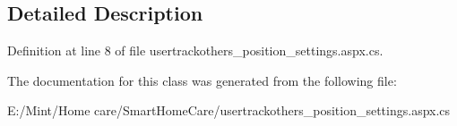 \subsection{Detailed Description}


Definition at line 8 of file usertrackothers\-\_\-position\-\_\-settings.\-aspx.\-cs.



The documentation for this class was generated from the following file\-:\begin{DoxyCompactItemize}
\item 
E\-:/\-Mint/\-Home care/\-Smart\-Home\-Care/usertrackothers\-\_\-position\-\_\-settings.\-aspx.\-cs\end{DoxyCompactItemize}
